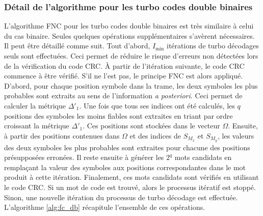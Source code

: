 \subsubsection{Détail de l'algorithme pour les turbo codes double binaires}
L'algorithme FNC pour les turbo codes double binaires est très similaire à celui du cas binaire. Seules quelques 
opérations supplémentaires s'avèrent nécessaires. Il peut être détaillé comme suit. Tout d'abord, $I_{\text{min}}$ itérations de 
turbo décodages seuls sont effectuées. Ceci permet de réduire le risque d'erreurs non détectées lors de la vérification 
du code CRC. À partir de l'itération suivante, le code CRC commence à être vérifié. S'il ne l'est pas, le principe FNC
est alors appliqué. D'abord, pour chaque position symbole dans la trame, les deux symboles les plus probables sont 
extraits au sens de l'information \textit{a posteriori}. Ceci permet de calculer la métrique $\Delta'_1$. Une fois que 
tous ses indices ont été calculés, les $q$ positions des symboles les moins fiables sont extraites en triant par ordre 
croissant la métrique $\Delta'_1$. Ces positions sont stockées dans le vecteur $\Omega$. Ensuite, à partir des positions contenues dans
$\Omega$ et des indices de $S_{M_x}$ et $S_{M_y}$, les valeurs des deux symboles les plus probables sont extraites pour 
chacune des positions présupposées erronées. Il reste ensuite à générer les $2^q$ mots candidats en remplaçant la valeur des symboles
aux positions correspondantes dans le mot produit à cette itération. Finalement, ces mots candidats sont vérifiés
en utilisant le code CRC. Si un mot de code est trouvé, alors le processus itératif est stoppé. Sinon, une nouvelle itération
du processus de turbo décodage est effectuée. L'algorithme \ref{alg:fc_db} récapitule l'ensemble de ces opérations.

